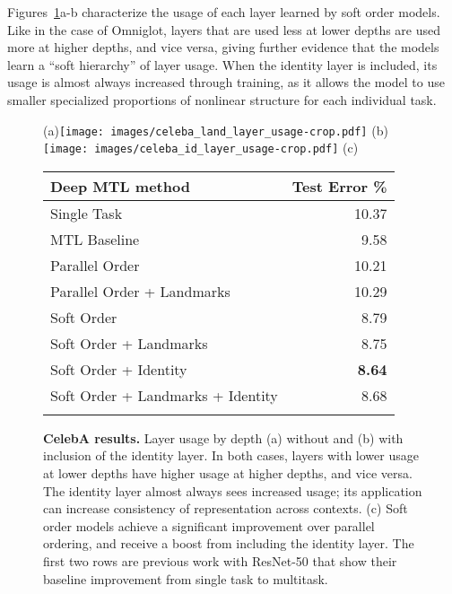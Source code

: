 \documentclass{article}
\theoremstyle{definition}
\theoremstyle{remark}
\begin{document}
Figures~\ref{fig:celeba_results}a-b characterize the usage of each layer learned by soft order models.
Like in the case of Omniglot, layers that are used less at lower depths are used more at higher depths, and vice versa, giving further evidence that the models learn a ``soft hierarchy'' of layer usage.
When the identity layer is included, its usage is almost always increased through training, as it allows the model to use smaller specialized proportions of nonlinear structure for each individual task.

\begin{figure}[t]
\footnotesize
\begin{center}
\begin{minipage}{.55\textwidth}
\vspace{0pt}
\centering
(a)\texttt{[image: images/celeba\_land\_layer\_usage-crop.pdf]}
\hspace{3pt}(b)\texttt{[image: images/celeba\_id\_layer\_usage-crop.pdf]}
\hspace{1pt}(c)
\end{minipage}%
\begin{minipage}{.45\textwidth}
\vspace{0pt}
\centering
\scriptsize
\begin{tabular}{lr}
    \toprule
    Deep MTL method     & Test Error \% \\
    \midrule
    Single Task \citep{He:2017} & 10.37 \\
    MTL Baseline \citep{He:2017} &  9.58 \\
    \midrule
    Parallel Order & 10.21 \\
    Parallel Order + Landmarks & 10.29 \\
    Soft Order & 8.79 \\
    Soft Order + Landmarks & 8.75 \\
    Soft Order + Identity & \textbf{8.64} \\
    Soft Order + Landmarks + Identity & 8.68 \\
    \bottomrule\\
\end{tabular}
\end{minipage}
\end{center}
\caption{\textbf{CelebA results.} 
Layer usage by depth (a) without and (b) with inclusion of the identity layer.
In both cases, layers with lower usage at lower depths have higher usage at higher depths, and vice versa.
The identity layer almost always sees increased usage; its application can increase consistency of representation across contexts.
(c) Soft order models achieve a significant improvement over parallel ordering, and receive a boost from including the identity layer.
The first two rows are previous work with ResNet-50 that show their baseline improvement from single task to multitask.
}
\label{fig:celeba_results}
\end{figure}
\end{document}
